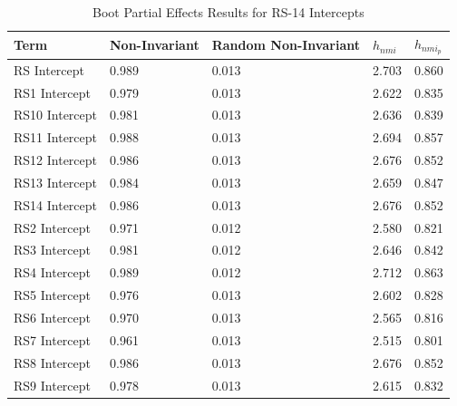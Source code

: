 \documentclass[
  man,floatsintext]{apa7}
\begin{document}
\begin{table}[tbp]

\begin{center}
\begin{threeparttable}

\caption{\label{tab:table-boot-effects}Boot Partial Effects Results for RS-14 Intercepts}

\begin{tabular}{lllll}
\toprule
Term & Non-Invariant & Random Non-Invariant & $h_{nmi}$ & $h_{nmi_p}$\\
\midrule
RS  Intercept & 0.989 & 0.013 & 2.703 & 0.860\\
RS1  Intercept & 0.979 & 0.013 & 2.622 & 0.835\\
RS10  Intercept & 0.981 & 0.013 & 2.636 & 0.839\\
RS11  Intercept & 0.988 & 0.013 & 2.694 & 0.857\\
RS12  Intercept & 0.986 & 0.013 & 2.676 & 0.852\\
RS13  Intercept & 0.984 & 0.013 & 2.659 & 0.847\\
RS14  Intercept & 0.986 & 0.013 & 2.676 & 0.852\\
RS2  Intercept & 0.971 & 0.012 & 2.580 & 0.821\\
RS3  Intercept & 0.981 & 0.012 & 2.646 & 0.842\\
RS4  Intercept & 0.989 & 0.012 & 2.712 & 0.863\\
RS5  Intercept & 0.976 & 0.013 & 2.602 & 0.828\\
RS6  Intercept & 0.970 & 0.013 & 2.565 & 0.816\\
RS7  Intercept & 0.961 & 0.013 & 2.515 & 0.801\\
RS8  Intercept & 0.986 & 0.013 & 2.676 & 0.852\\
RS9  Intercept & 0.978 & 0.013 & 2.615 & 0.832\\
\bottomrule
\end{tabular}

\end{threeparttable}
\end{center}

\end{table}
\end{document}
